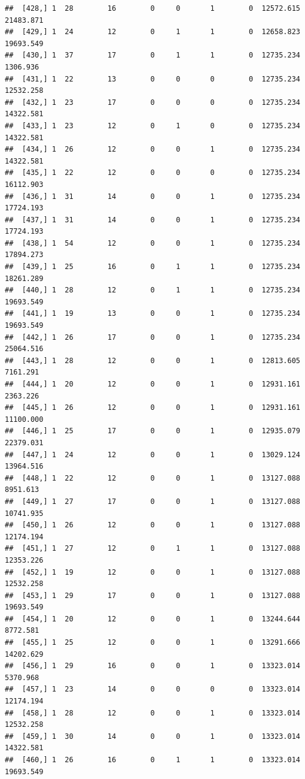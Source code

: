 \documentclass[
]{article}
\begin{document}
\begin{verbatim}
##  [428,] 1  28        16        0     0       1        0  12572.615  21483.871
##  [429,] 1  24        12        0     1       1        0  12658.823  19693.549
##  [430,] 1  37        17        0     1       1        0  12735.234   1306.936
##  [431,] 1  22        13        0     0       0        0  12735.234  12532.258
##  [432,] 1  23        17        0     0       0        0  12735.234  14322.581
##  [433,] 1  23        12        0     1       0        0  12735.234  14322.581
##  [434,] 1  26        12        0     0       1        0  12735.234  14322.581
##  [435,] 1  22        12        0     0       0        0  12735.234  16112.903
##  [436,] 1  31        14        0     0       1        0  12735.234  17724.193
##  [437,] 1  31        14        0     0       1        0  12735.234  17724.193
##  [438,] 1  54        12        0     0       1        0  12735.234  17894.273
##  [439,] 1  25        16        0     1       1        0  12735.234  18261.289
##  [440,] 1  28        12        0     1       1        0  12735.234  19693.549
##  [441,] 1  19        13        0     0       1        0  12735.234  19693.549
##  [442,] 1  26        17        0     0       1        0  12735.234  25064.516
##  [443,] 1  28        12        0     0       1        0  12813.605   7161.291
##  [444,] 1  20        12        0     0       1        0  12931.161   2363.226
##  [445,] 1  26        12        0     0       1        0  12931.161  11100.000
##  [446,] 1  25        17        0     0       1        0  12935.079  22379.031
##  [447,] 1  24        12        0     0       1        0  13029.124  13964.516
##  [448,] 1  22        12        0     0       1        0  13127.088   8951.613
##  [449,] 1  27        17        0     0       1        0  13127.088  10741.935
##  [450,] 1  26        12        0     0       1        0  13127.088  12174.194
##  [451,] 1  27        12        0     1       1        0  13127.088  12353.226
##  [452,] 1  19        12        0     0       1        0  13127.088  12532.258
##  [453,] 1  29        17        0     0       1        0  13127.088  19693.549
##  [454,] 1  20        12        0     0       1        0  13244.644   8772.581
##  [455,] 1  25        12        0     0       1        0  13291.666  14202.629
##  [456,] 1  29        16        0     0       1        0  13323.014   5370.968
##  [457,] 1  23        14        0     0       0        0  13323.014  12174.194
##  [458,] 1  28        12        0     0       1        0  13323.014  12532.258
##  [459,] 1  30        14        0     0       1        0  13323.014  14322.581
##  [460,] 1  26        16        0     1       1        0  13323.014  19693.549

\end{verbatim}
\end{document}

